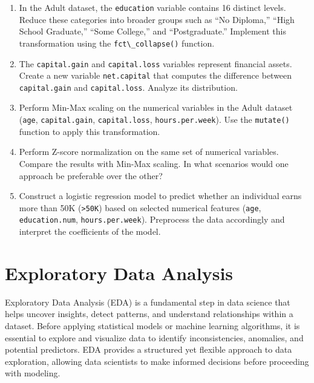 \documentclass[
  11pt,
]{book}
\newcommand{\passthrough}[1]{#1}
\theoremstyle{definition}
\theoremstyle{definition}
\theoremstyle{definition}
\theoremstyle{definition}
\theoremstyle{remark}
\begin{document}
\begin{enumerate}
\def\labelenumi{\arabic{enumi}.}
\setcounter{enumi}{15}
\item
  In the Adult dataset, the \passthrough{\lstinline!education!} variable contains 16 distinct levels. Reduce these categories into broader groups such as ``No Diploma,'' ``High School Graduate,'' ``Some College,'' and ``Postgraduate.'' Implement this transformation using the \passthrough{\lstinline!fct\_collapse()!} function.
\item
  The \passthrough{\lstinline!capital.gain!} and \passthrough{\lstinline!capital.loss!} variables represent financial assets. Create a new variable \passthrough{\lstinline!net.capital!} that computes the difference between \passthrough{\lstinline!capital.gain!} and \passthrough{\lstinline!capital.loss!}. Analyze its distribution.
\item
  Perform Min-Max scaling on the numerical variables in the Adult dataset (\passthrough{\lstinline!age!}, \passthrough{\lstinline!capital.gain!}, \passthrough{\lstinline!capital.loss!}, \passthrough{\lstinline!hours.per.week!}). Use the \passthrough{\lstinline!mutate()!} function to apply this transformation.
\item
  Perform Z-score normalization on the same set of numerical variables. Compare the results with Min-Max scaling. In what scenarios would one approach be preferable over the other?
\item
  Construct a logistic regression model to predict whether an individual earns more than 50K (\passthrough{\lstinline!>50K!}) based on selected numerical features (\passthrough{\lstinline!age!}, \passthrough{\lstinline!education.num!}, \passthrough{\lstinline!hours.per.week!}). Preprocess the data accordingly and interpret the coefficients of the model.
\end{enumerate}

\chapter{Exploratory Data Analysis}\label{chapter-EDA}

Exploratory Data Analysis (EDA) is a fundamental step in data science that helps uncover insights, detect patterns, and understand relationships within a dataset. Before applying statistical models or machine learning algorithms, it is essential to explore and visualize data to identify inconsistencies, anomalies, and potential predictors. EDA provides a structured yet flexible approach to data exploration, allowing data scientists to make informed decisions before proceeding with modeling.
\end{document}
